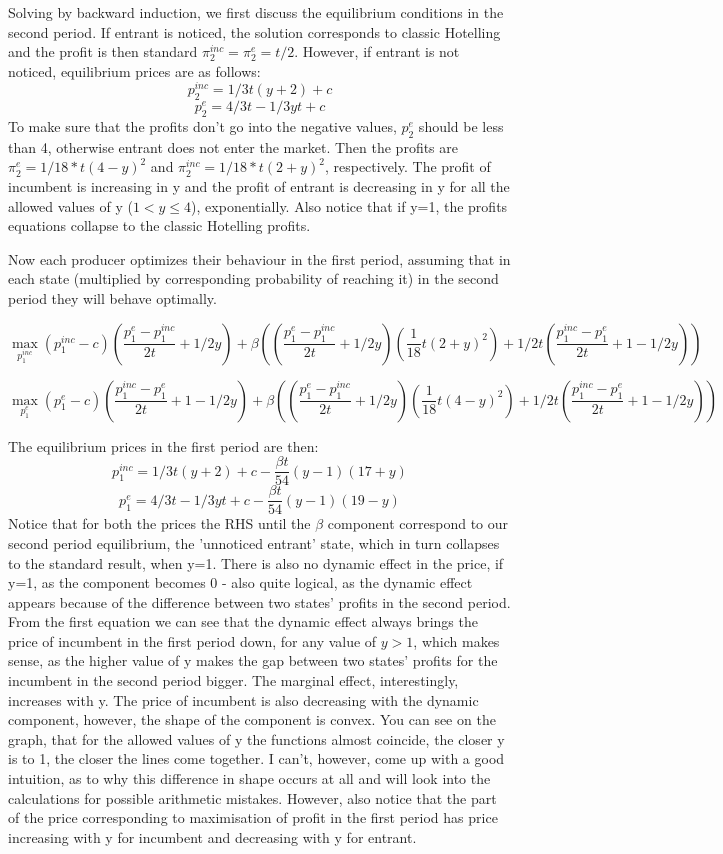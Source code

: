 \documentclass{article}
\begin{document}
    
Solving by backward induction, we first discuss the equilibrium conditions in the second period. 
If entrant is noticed, the solution corresponds to classic Hotelling and the profit is then standard $\pi_{2}^{inc} = \pi_{2}^{e}= t/2$. However, if entrant is not noticed, equilibrium prices are as follows:
$$
p^{inc}_2 =1/3t(y+ 2) + c $$
$$ p^{e}_2 =4/3t - 1/3yt + c$$
To make sure that the profits don't go into the negative values, $ p^{e}_2$ should be less than 4, otherwise entrant does not enter the market. Then the profits are $\pi_{2}^{e} = 1/18*t(4-y)^2$ and $\pi_{2}^{inc}=1/18*t(2+y)^2$, respectively. The profit of incumbent is increasing in y and the profit of entrant is decreasing in y for all the allowed values of y ($1<y\leq4$), exponentially. Also notice that if y=1, the profits equations collapse to the classic Hotelling profits. 

Now each producer optimizes their behaviour in the first period, assuming that in each state (multiplied by corresponding probability of reaching it) in the second period they will behave optimally. 

	


 $$
    \max_{p^{inc}_1} {}
   (p^{inc}_1-c)(\frac{p^{e}_1-p^{inc}_1}{2t} + 1/2y) 
    + \beta((\frac{p^{e}_1-p^{inc}_1}{2t} + 1/2y)(\frac{1}{18}t(2+y)^2) + 
    1/2t(\frac{p^{inc}_1-p^{e}_1}{2t} + 1 - 1/2y))
    $$
    
    $$
   \max_{p^{e}_1} {}
   (p^{e}_1-c)(\frac{p^{inc}_1-p^{e}_1}{2t} + 1 -1/2y) 
    + \beta((\frac{p^{e}_1-p^{inc}_1}{2t} + 1/2y)(\frac{1}{18}t(4-y)^2) + 
    1/2t(\frac{p^{inc}_1-p^{e}_1}{2t} + 1 - 1/2y))
    $$

The equilibrium prices in the first period are then:
$$
p^{inc}_1 =1/3t(y+ 2) + c - \frac{\beta t }{54}(y-1)(17+y) $$
$$ p^{e}_1 =4/3t - 1/3yt + c - \frac{\beta t}{54}(y-1)(19-y)$$
Notice that for both the prices the RHS until the $ \beta$ component correspond to our second period equilibrium, the 'unnoticed entrant' state, which in turn collapses to the standard result, when y=1. There is also no dynamic effect in the price, if y=1, as the component becomes 0 - also quite logical, as the dynamic effect appears because of the difference between two states' profits in the second period. From the first equation we can see that the dynamic effect always brings the price of incumbent in the first period down, for any value of $y>1$, which makes sense, as the higher value of y makes the gap between two states' profits for the incumbent in the second period bigger. The marginal effect, interestingly, increases with y. The price of incumbent is also decreasing with the dynamic component, however, the shape of the component is convex. You can see on the graph, that for the allowed values of y the functions almost coincide, the closer y is to 1, the closer the lines come together. I can't, however, come up with a good intuition, as to why this difference in shape occurs at all and will look into the calculations for possible arithmetic mistakes. However, also notice that the part of the price corresponding to maximisation of profit in the first period has price increasing with y for incumbent and decreasing with y for entrant.
\end{document}
